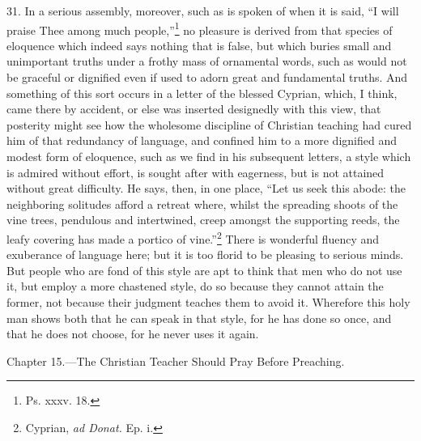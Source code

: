 31. In a serious assembly, moreover, such as is spoken of when it is said, “I will praise Thee among much people,”\footnote{Ps. xxxv. 18.} no pleasure is derived from that species of eloquence which indeed says nothing that is false, but which buries small and unimportant truths under a frothy mass of ornamental words, such as would not be graceful or dignified even if used to adorn great and fundamental truths. And something of this sort occurs in a letter of the blessed Cyprian, which, I think, came there by accident, or else was inserted designedly with this view, that posterity might see how the wholesome discipline of Christian teaching had cured him of that redundancy of language, and confined him to a more dignified and modest form of eloquence, such as we find in his subsequent letters, a style which is admired without effort, is sought after with eagerness, but is not attained without great difficulty. He says, then, in one place, “Let us seek this abode: the neighboring solitudes afford a retreat where, whilst the spreading shoots of the vine trees, pendulous and intertwined, creep amongst the supporting reeds, the leafy covering has made a portico of vine.”\footnote{Cyprian, \emph{ad Donat.} Ep. i.} There is wonderful fluency and exuberance of language here; but it is too florid to be pleasing to serious minds. But people who are fond of this style are apt to think that men who do not use it, but employ a more chastened style, do so because they cannot attain the former, not because their judgment teaches them to avoid it. Wherefore this holy man shows both that he can speak in that style, for he has done so once, and that he does not choose, for he never uses it again.


Chapter 15.—The Christian Teacher Should Pray Before Preaching.

